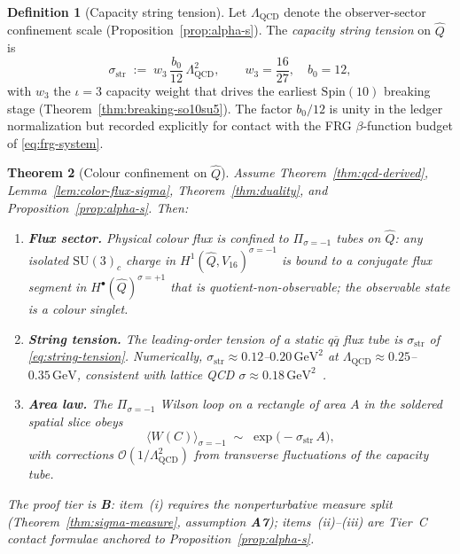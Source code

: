 \documentclass[aps,prd,onecolumn,amsmath,amssymb,nofootinbib,11pt]{revtex4-2}
\numberwithin{equation}{section}
\theoremstyle{plain}
\newtheorem{theorem}{Theorem}[section]
\theoremstyle{definition}
\newtheorem{definition}[theorem]{Definition}
\theoremstyle{remark}
\newcommand{\Spin}{\mathrm{Spin}}
\begin{document}
\begin{definition}[Capacity string tension]\label{def:string-tension}
Let $\Lambda_{\mathrm{QCD}}$ denote the observer-sector confinement scale
(Proposition~\ref{prop:alpha-s}). The \emph{capacity string tension} on
$\hat Q$ is
\begin{equation}\label{eq:string-tension}
  \sigma_{\mathrm{str}}
  \;:=\;
  w_3\,\frac{b_0}{12}\,\Lambda_{\mathrm{QCD}}^{2},
  \qquad
  w_3=\frac{16}{27},\quad b_0=12,
\end{equation}
with $w_3$ the $\iota=3$ capacity weight that drives the earliest
$\Spin(10)$ breaking stage (Theorem~\ref{thm:breaking-so10su5}). The factor
$b_0/12$ is unity in the ledger normalization but recorded explicitly for
contact with the FRG $\beta$-function budget of \eqref{eq:frg-system}.
\end{definition}

\begin{theorem}[Colour confinement on $\hat Q$]
\label{thm:confinement}
Assume Theorem~\ref{thm:qcd-derived}, Lemma~\ref{lem:color-flux-sigma},
Theorem~\ref{thm:duality}, and Proposition~\ref{prop:alpha-s}. Then:
\begin{enumerate}[label=(\roman*),leftmargin=*]
  \item \textbf{Flux sector.} Physical colour flux is confined to
    $\Pi_{\sigma=-1}$ tubes on $\hat Q$: any isolated $\mathrm{SU}(3)_c$
    charge in $H^1(\hat Q,V_{16})^{\sigma=-1}$ is bound to a conjugate flux
    segment in $H^\bullet(\hat Q)^{\sigma=+1}$ that is
    quotient-non-observable; the observable state is a colour singlet.
  \item \textbf{String tension.} The leading-order tension of a static
    $q\overline{q}$ flux tube is $\sigma_{\mathrm{str}}$ of
    \eqref{eq:string-tension}. Numerically,
    $\sigma_{\mathrm{str}}\approx 0.12$--$0.20\,\mathrm{GeV}^2$ at
    $\Lambda_{\mathrm{QCD}}\approx 0.25$--$0.35\,\mathrm{GeV}$, consistent
    with lattice QCD $\sigma\approx 0.18\,\mathrm{GeV}^2$~\cite{PDG2025}.
  \item \textbf{Area law.} The $\Pi_{\sigma=-1}$ Wilson loop on a
    rectangle of area $A$ in the soldered spatial slice obeys
    \begin{equation}\label{eq:area-law}
      \langle W(C)\rangle_{\sigma=-1}
      \;\sim\;
      \exp\!\bigl(-\sigma_{\mathrm{str}}\,A\bigr),
    \end{equation}
    with corrections $\mathcal{O}(1/\Lambda_{\mathrm{QCD}}^2)$ from
    transverse fluctuations of the capacity tube.
\end{enumerate}
The proof tier is \textbf{B}: item~(i) requires the nonperturbative measure
split (Theorem~\ref{thm:sigma-measure}, assumption \textbf{A7}); items~(ii)--(iii)
are Tier~C contact formulae anchored to Proposition~\ref{prop:alpha-s}.
\end{theorem}
\end{document}
